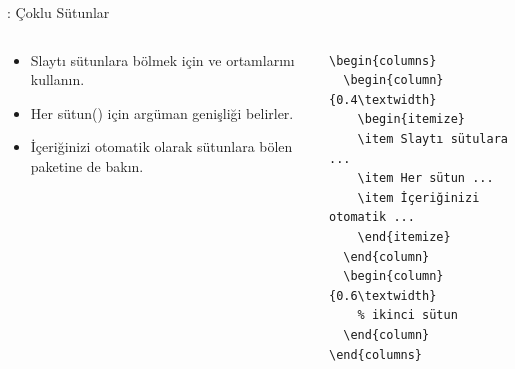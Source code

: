 \documentclass[aspectratio=169]{beamer}
\begin{document}
\begin{frame}[fragile]{\insertsection: Çoklu Sütunlar}
\begin{columns}
\begin{column}{0.4\textwidth}
\begin{itemize}
\item Slaytı sütunlara bölmek için  ve  ortamlarını kullanın.
\item Her sütun() için argüman genişliği belirler.
\item İçeriğinizi otomatik olarak sütunlara bölen  paketine de bakın.
\end{itemize}
\end{column}
\begin{column}{0.6\textwidth}
\begin{verbatim}
\begin{columns}
  \begin{column}{0.4\textwidth}
    \begin{itemize}
    \item Slaytı sütulara ...
    \item Her sütun ...
    \item İçeriğinizi otomatik ...
    \end{itemize}
  \end{column}
  \begin{column}{0.6\textwidth}
    % ikinci sütun
  \end{column}
\end{columns}
\end{verbatim}
\end{column}
\end{columns}
\end{frame}
\end{document}
